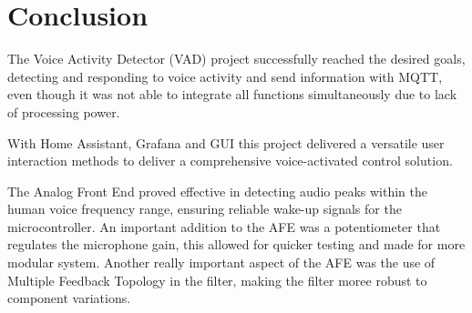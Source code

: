 \section{Conclusion}

The Voice Activity Detector (VAD) project successfully reached the desired goals, detecting and responding to voice activity and send information with MQTT, even though it was not able to integrate all functions simultaneously due to lack of processing power. 

With Home Assistant, Grafana and GUI this project delivered a versatile user interaction methods to deliver a comprehensive voice-activated control solution.

The Analog Front End proved effective in detecting audio peaks within the human voice frequency range, ensuring reliable wake-up signals for the microcontroller. An important addition to the AFE was a potentiometer that regulates the microphone gain, this allowed for quicker testing and made for more modular system. Another really important aspect of the AFE was the use of Multiple Feedback Topology in the filter, making the filter moree robust to component variations.
